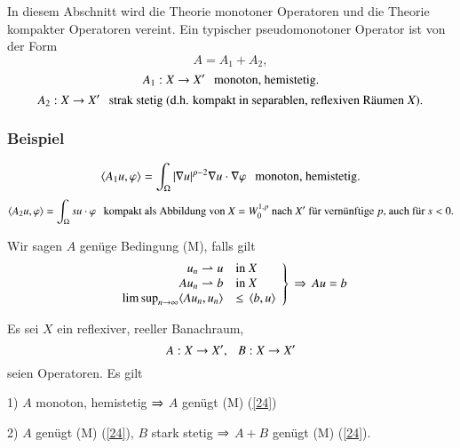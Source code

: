 In diesem Abschnitt wird die Theorie monotoner Operatoren und die Theorie kompakter Operatoren vereint.
Ein typischer pseudomonotoner Operator ist von der Form
\[
    A=A_1+A_2,
\] 
\[
    A_1: X\rightarrow X' \hspace{.25cm} \text{monoton, hemistetig.}
\]
\[
    A_2:X\rightarrow X' \hspace{.25cm} \text{strak stetig (d.h. kompakt in separablen, reflexiven Räumen $X$).}
\]

\subsubsection*{Beispiel}
\[
    \langle A_1u,\varphi\rangle = \int_\Omega |\nabla u|^{p-2} \nabla u \cdot \nabla \varphi\hspace{.25cm}
    \text{monoton, hemistetig.}
\]
\[
    \langle A_2u , \varphi \rangle =\int_\Omega su\cdot \varphi\hspace{.25cm}
    \text{kompakt als Abbildung von $X=W_0^{1,p}$ nach $X'$ für vernünftige $p$, auch für $s<0$.}
\]

\begin{defi} \label{4.13}
Wir sagen $A$ genüge Bedingung (M), falls gilt
\begin{align}\label{24}
    \left.\begin{array}{rl}
    u_n\rightharpoonup u & \text{in $X$} \\
    Au_n\rightharpoonup b & \text{in $X$} \\
    \limsup_{n\rightarrow \infty} \langle Au_n,u_n\rangle &\leq\, \langle b,u\rangle
    \end{array}\right\}
    \,\Rightarrow \, Au=b
\end{align}
\end{defi}

\begin{lem}\label{4.14}
    Es sei $X$ ein reflexiver, reeller Banachraum,
    \[
        A:X\rightarrow X', \hspace{.25cm} B: X\rightarrow X'
    \]
    seien Operatoren.
    Es gilt
    \begin{description}
        \item{1)}
        $A$ monoton, hemistetig $\Rightarrow$ $A$ genügt (M) (\ref{24})
        \item{2)}
        $A$ genügt (M) (\ref{24}), $B$ stark stetig $\Rightarrow$ $A+B$ genügt (M) (\ref{24}).
    \end{description}
\end{lem}

